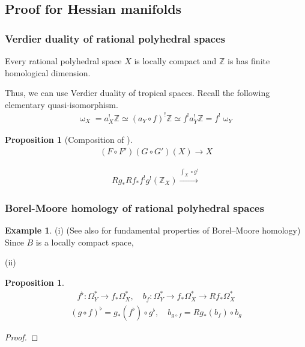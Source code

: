 \documentclass[a4paper,dvipdfmx,reqno,12pt]{amsart}
\theoremstyle{definition}
\newtheorem{Eg}[Thm]{Example}
\newtheorem{Prop}[Thm]{Proposition}
\newcommand{\Z}{\mathbb{Z}}%
\newcommand{\xto}[1]{\xrightarrow{#1}}
\numberwithin{equation}{section}
\begin{document}
\subsection{Proof for Hessian manifolds}

\subsubsection{Verdier duality of rational polyhedral spaces}

Every rational polyhedral space $X$ is locally compact and $\Z$ is has finite homological dimension.

Thus, we can use Verdier duality of tropical spaces.
Recall the following elementary quasi-isomorphism.
\begin{align}
  \upomega_X=a_X^{!}\Z\simeq (a_Y\circ f)^{!}\Z \simeq f^{!}a_Y^{!}\Z=f^{!}\upomega_Y
\end{align}



\begin{Prop}[Composition of ]
  \begin{align}
    (F\circ F')(G\circ G')(X)\to X
  \end{align}

  \begin{align}
    Rg_*Rf_*f^{!}g^{!}(\Z_X)\xto{\int_X\circ g^{!}}
  \end{align}

\end{Prop}

\subsubsection{Borel-Moore homology of rational polyhedral spaces}



\begin{Eg} (i) 
(See also \cite[IX]{iversenCohomologySheaves1986a}
for fundamental properties of Borel--Moore homology)
  Since $B$ is a locally compact space,



  (ii)

\end{Eg}



\begin{Prop}

  \begin{align}
    f^{\flat}:\Omega_Y^{*}\to f_*\Omega_X^{*}, \quad b_f: \Omega_Y^{*}\to f_*\Omega_X^{*} \to Rf_*\Omega_X^{*}
  \end{align}
  \begin{align}
    (g\circ f)^{\flat}=g_*(f^{\flat})\circ g^{\flat},
    \quad b_{g\circ f}=Rg_*(b_f)\circ b_g
  \end{align}
\end{Prop}
\begin{proof}

\end{proof}
\end{document}
